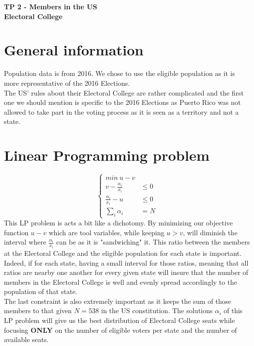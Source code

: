 \documentclass[a4paper,10pt,calibri,oneside,openany, twocolumn]{report}
\theoremstyle{break}
\begin{document}
	\begin{center}
		\bfseries TP 2 - Members in the US\\ Electoral College
	\end{center}
\section*{General information}
Population data is from 2016. We chose to use the eligible population as it is more representative of the 2016 Elections.\\

The US' rules about their Electoral College are rather complicated and the first one we should mention is specific to the 2016 Elections as Puerto Rico was not allowed to take part in the voting process as it is seen as a territory and not a state.
\section*{Linear Programming problem}
\begin{equation}
\begin{cases}
min\ u-v& \\
v - \frac{\alpha_i}{x_i}&\leq 0\\
\frac{\alpha_i}{x_i}- u &\leq 0\\
\sum\limits_i \alpha_i &= N
\end{cases}
\end{equation}
This LP problem is acts a bit like a dichotomy. By minimizing our objective function $u-v$ which are tool variables, while keeping $u>v$, will diminish the interval where $\frac{\alpha_i}{x_i}$ can be as it is "sandwiching" it. This ratio between the members at the Electoral College and the eligible population for each state is important. Indeed, if for each state, having a small interval for those ratios, meaning that all ratios are nearby one another for every given state will insure that the number of members in the Electoral College is well and evenly spread accordingly to the population of that state.\\

The last constraint is also extremely important as it keeps the sum of those members to that given $N=538$ in the US constitution. The solutions $\alpha_i$ of this LP problem will give us the best distribution of Electoral College seats while focusing \textbf{ONLY} on the number of eligible voters per state and the number of available seats. \\
\end{document}
